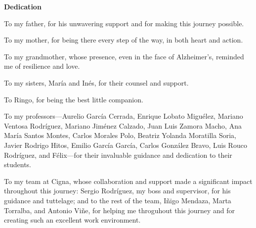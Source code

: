 \begin{center}
    {\large \textbf{Dedication}} \vspace{2cm}

    To my father, for his unwavering support and for making this journey possible.  

    To my mother, for being there every step of the way, in both heart and action.  

    To my grandmother, whose presence, even in the face of Alzheimer's, reminded me of resilience and love.  

    To my sisters, María and Inés, for their counsel and support.  

    To Ringo, for being the best little companion.  

    To my professors—Aurelio García Cerrada, Enrique Lobato Miguélez, Mariano Ventosa Rodríguez, Mariano Jiménez Calzado, Juan Luis Zamora Macho, Ana María Santos Montes, Carlos Morales Polo, Beatriz Yolanda Moratilla Soria, Javier Rodrigo Hitos, Emilio García García, Carlos González Bravo, Luis Rouco Rodríguez, and Félix—for their invaluable guidance and dedication to their students.  

    To my team at Cigna, whose collaboration and support made a significant impact throughout this journey:  
    Sergio Rodríguez, my boss and supervisor, for his guidance and tuttelage;  
    and to the rest of the team, Iñigo Mendaza, Marta Torralba, and Antonio Viñe, for helping me throguhout this journey and for creating such an excellent work environment.  
\end{center}
